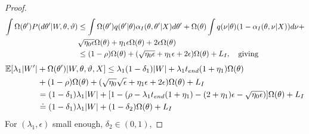 \begin{proof}
\begin{align*}
  \int \Omega(\theta') P(d\theta'| W, \theta, \vartheta)
  & \leq \int \Omega(\theta') q(\theta' | \theta)\alpha_I(\theta, \theta'| X) d\theta'  + \Omega(\theta)\int  q(\nu | \theta) (1 - \alpha_I(\theta, \nu | X)) d\nu+ \\
  &\sqrt{\eta_0\epsilon}\Omega(\theta)  +  \eta_1 \epsilon \Omega(\theta) + 2\epsilon \Omega(\theta)\\
  & \leq (1 - \rho) \Omega(\theta) + (\sqrt{\eta_0\epsilon} +  \eta_1 \epsilon + 2\epsilon) \Omega(\theta) + L_I, \quad \text{giving}
\end{align*}
\vspace{-.3in}
\begin{align*}
\mathbb{E}[\lambda_1 | W'| &+ \Omega(\theta')| W, \theta, \vartheta, X] \le \lambda_1(1 - \delta_1)|W| + \lambda_1 t_{end} (1 + \eta_1)\Omega(\theta)\\
&+  (1 - \rho) \Omega(\theta) + (\sqrt{\eta_0} \sqrt{\epsilon} +  \eta_1 \epsilon + 2\epsilon) \Omega(\theta) + L_I\\
& = (1 - \delta_1)\lambda_1 |W| + [1 - (\rho - \lambda_1 t_{end} (1 + \eta_1) - (2 + \eta_1)\epsilon - \sqrt{\eta_0 \epsilon})]\Omega(\theta) + L_I\\
& \doteq (1 - \delta_1)\lambda_1 |W| + (1 - \delta_2)\Omega(\theta) + L_I
\end{align*}
For $(\lambda_1,\epsilon)$ small enough, $\delta_2 \in (0,1)$, 

\end{proof}
